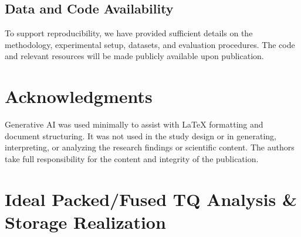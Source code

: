 \documentclass[sigconf,nonacm]{acmart}
\begin{document}
\begin{itemize}
\subsection{Data and Code Availability}
To support reproducibility, we have provided sufficient details on the methodology, experimental setup, datasets, and evaluation procedures. The code and relevant resources will be made publicly available upon publication.





\FloatBarrier
\section{Acknowledgments}

Generative AI was used minimally to assist with LaTeX formatting and document structuring. It was not used in the study design or in generating, interpreting, or analyzing the research findings or scientific content. The authors take full responsibility for the content and integrity of the publication.


\begingroup
\sloppy
{}

\endgroup

\clearpage  %
\appendix

\section{Ideal Packed/Fused TQ Analysis \& Storage Realization}
\label{app:ideal}


\end{itemize}
\end{document}
